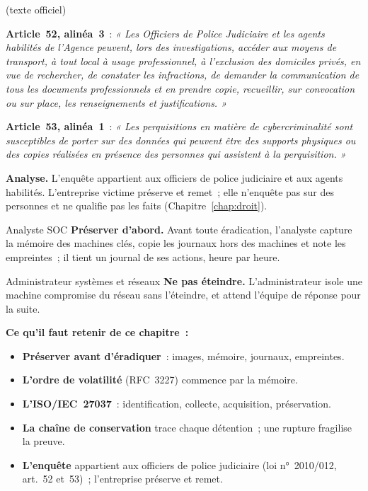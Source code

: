 \begin{boxjuris}
\textbf{} (texte officiel)

\medskip
\textbf{Article~52, alinéa~3}~: \textit{« Les Officiers de Police
Judiciaire et les agents habilités de l'Agence peuvent, lors des
investigations, accéder aux moyens de transport, à tout local à usage
professionnel, à l'exclusion des domiciles privés, en vue de rechercher,
de constater les infractions, de demander la communication de tous les
documents professionnels et en prendre copie, recueillir, sur convocation
ou sur place, les renseignements et justifications. »}

\medskip
\textbf{Article~53, alinéa~1}~: \textit{« Les perquisitions en matière de
cybercriminalité sont susceptibles de porter sur des données qui peuvent
être des supports physiques ou des copies réalisées en présence des
personnes qui assistent à la perquisition. »}

\medskip
\textbf{Analyse.} L'enquête appartient aux officiers de police judiciaire
et aux agents habilités. L'entreprise victime préserve et remet~; elle
n'enquête pas sur des personnes et ne qualifie pas les faits
(Chapitre~\ref{chap:droit}).
\end{boxjuris}

\begin{boxmetier}{Analyste SOC}
\textbf{Préserver d'abord.} Avant toute éradication, l'analyste capture la
mémoire des machines clés, copie les journaux hors des machines et note
les empreintes~; il tient un journal de ses actions, heure par heure.
\end{boxmetier}

\begin{boxmetier}{Administrateur systèmes et réseaux}
\textbf{Ne pas éteindre.} L'administrateur isole une machine compromise
du réseau sans l'éteindre, et attend l'équipe de réponse pour la suite.
\end{boxmetier}

\separateur

\begin{boxresume}
\textbf{Ce qu'il faut retenir de ce chapitre~:}
\begin{itemize}
    \item \textbf{Préserver avant d'éradiquer}~: images, mémoire, journaux,
          empreintes.
    \item \textbf{L'ordre de volatilité} (RFC~3227) commence par la mémoire.
    \item \textbf{L'ISO/IEC~27037}~: identification, collecte, acquisition,
          préservation.
    \item \textbf{La chaîne de conservation} trace chaque détention~; une
          rupture fragilise la preuve.
    \item \textbf{L'enquête} appartient aux officiers de police judiciaire
          (loi n°~2010/012, art.~52 et~53)~; l'entreprise préserve et
          remet.
\end{itemize}
\end{boxresume}

